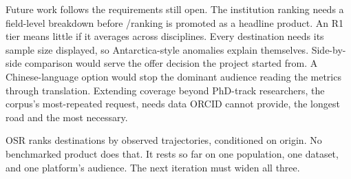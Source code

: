 Future work follows the requirements still open. The institution ranking needs a field-level breakdown before /ranking is promoted as a headline product. An R1 tier means little if it averages across disciplines. Every destination needs its sample size displayed, so Antarctica-style anomalies explain themselves. Side-by-side comparison would serve the offer decision the project started from. A Chinese-language option would stop the dominant audience reading the metrics through translation. Extending coverage beyond PhD-track researchers, the corpus's most-repeated request, needs data ORCID cannot provide, the longest road and the most necessary.

OSR ranks destinations by observed trajectories, conditioned on origin. No benchmarked product does that. It rests so far on one population, one dataset, and one platform's audience. The next iteration must widen all three.
